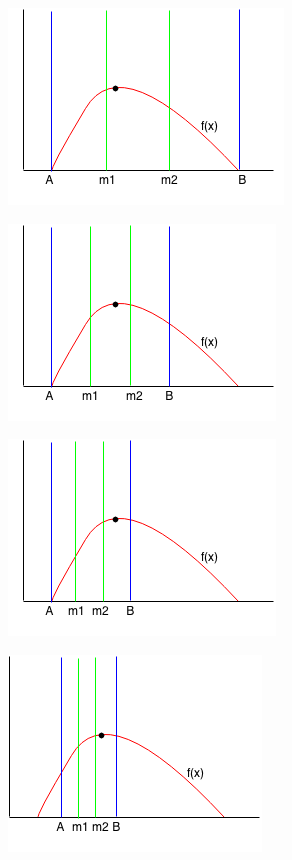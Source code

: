 \documentclass[11pt,oneside]{book}
\makeatletter
\def\maxwidth#1{\ifdim\Gin@nat@width>#1 #1\else\Gin@nat@width\fi}
\makeatother
\begin{document}
\vspace{5px}\includegraphics[width=\maxwidth{\textwidth}]{ternarysearch2.png}

\vspace{5px}\includegraphics[width=\maxwidth{\textwidth}]{ternarysearch3.png}

\vspace{5px}\includegraphics[width=\maxwidth{\textwidth}]{ternarysearch4.png}

\vspace{5px}\includegraphics[width=\maxwidth{\textwidth}]{ternarysearch5.png}
\end{document}
